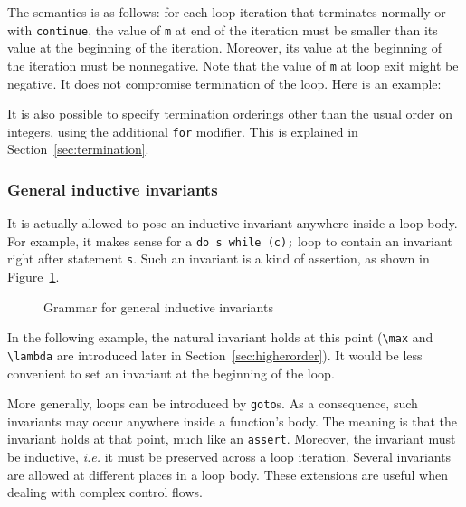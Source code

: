 The semantics is as follows: for each loop iteration that terminates
normally or with \lstinline|continue|, the value of \lstinline|m| at end of the
iteration must be smaller than its value at the beginning of the
iteration. Moreover, its value at the beginning of the iteration
must be nonnegative. Note that the value of \lstinline|m| at loop exit might be
negative. It does not compromise termination of the
loop. Here is an example:

\begin{example}
  \hspace{0pt}
  \label{ex:loopvariant}
\end{example}

It is also possible to specify termination orderings other than the
usual order on integers, using the additional \lstinline|for|
modifier. This is explained in Section~\ref{sec:termination}.

\subsubsection{General inductive invariants}\label{sec:generalized-invariants}
It is actually allowed to pose an inductive invariant
anywhere inside a loop body.
For example, it makes sense for a
\lstinline|do s while (c);| loop to contain an invariant right after statement
\lstinline|s|. Such an invariant is a kind of assertion, as
shown in Figure~\ref{fig:advancedinvariants}.

\begin{figure}[htp]
  \begin{cadre}
    
  \end{cadre}
  \caption{Grammar for general inductive invariants}
  \label{fig:advancedinvariants}
\end{figure}

\begin{example}
  In the following example, the natural invariant holds at this point
  (\lstinline!\max! and \lstinline!\lambda! are introduced later in
  Section~\ref{sec:higherorder}).
  It would be less convenient to set an invariant at the beginning
  of the loop.
\end{example}

More generally, loops can be introduced by \lstinline|goto|s.
As a consequence, such invariants may occur anywhere
inside a function's body. The meaning is that the invariant
holds at that point, much like an \lstinline{assert}. Moreover, the
invariant must be inductive, \emph{i.e.} it must be preserved across a
loop iteration. Several invariants are allowed at different places in
a loop body. These extensions are useful when dealing with complex
control flows.

